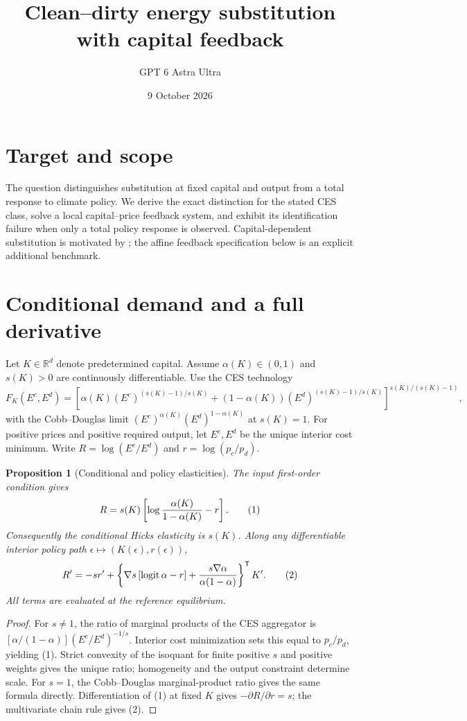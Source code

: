 \documentclass[11pt]{article}
\title{Clean--dirty energy substitution with capital feedback}
\author{GPT 6 Astra Ultra}
\date{9 October 2026}
\newtheorem{proposition}[theorem]{Proposition}
\theoremstyle{definition}
\begin{document}
\maketitle
\section*{Target and scope}
The question distinguishes substitution at fixed capital and output from a
total response to climate policy. We derive the exact distinction for the
stated CES class, solve a local capital--price feedback system, and exhibit
its identification failure when only a total policy response is observed.
Capital-dependent substitution is motivated by \cite{drh}; the affine
feedback specification below is an explicit additional benchmark.

\section*{Conditional demand and a full derivative}
Let $K\in\mathbb R^d$ denote predetermined capital. Assume $\alpha(K)\in(0,1)$
and $s(K)>0$ are continuously differentiable. Use the CES technology
\[
 F_K(E^c,E^d)=\left[\alpha(K)(E^c)^{(s(K)-1)/s(K)}
 +(1-\alpha(K))(E^d)^{(s(K)-1)/s(K)}\right]^{s(K)/(s(K)-1)},
\]
with the Cobb--Douglas limit $(E^c)^{\alpha(K)}(E^d)^{1-\alpha(K)}$
at $s(K)=1$. For positive prices and
positive required output, let $E^c,E^d$ be the unique interior cost minimum.
Write $R=\log(E^c/E^d)$ and $r=\log(p_c/p_d)$.
\begin{proposition}[Conditional and policy elasticities]
The input first-order condition gives
\[
 R=s(K)\left[\log{\alpha(K)\over1-\alpha(K)}-r\right]. \tag{1}
\]
Consequently the conditional Hicks elasticity is $s(K)$. Along any
differentiable interior policy path $\epsilon\mapsto(K(\epsilon),r(\epsilon))$,
\[
 R'= -s r'+\left\{\nabla s\,[\operatorname{logit}\alpha-r]
       +{s\nabla\alpha\over\alpha(1-\alpha)}\right\}^{\mathsf T}K'. \tag{2}
\]
All terms are evaluated at the reference equilibrium.
\end{proposition}
\begin{proof}
For $s\ne1$, the ratio of marginal products of the CES aggregator is
$[\alpha/(1-\alpha)](E^c/E^d)^{-1/s}$. Interior cost minimization sets
this equal to $p_c/p_d$, yielding (1). Strict convexity of the isoquant
for finite positive $s$ and positive weights gives the unique ratio;
homogeneity and the output constraint determine scale. For $s=1$, the
Cobb--Douglas marginal-product ratio gives the same formula directly.
Differentiation of (1) at fixed $K$ gives $-\partial R/\partial r=s$;
the multivariate chain rule gives (2).
\end{proof}
\end{document}
